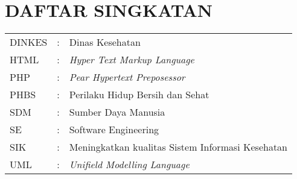 %
%
%
%

\chapter*{DAFTAR SINGKATAN}
\begin{tabular}{lll}
DINKES &:& Dinas Kesehatan\\
HTML &:& \textit{Hyper Text Markup Language}\\
PHP &:&\textit{Pear Hypertext Preposessor}\\
PHBS &:& Perilaku Hidup Bersih dan Sehat\\
SDM &:& Sumber Daya Manusia\\
SE &:& Software Engineering\\
SIK &:& Meningkatkan kualitas Sistem Informasi Kesehatan\\
UML &:& \textit{Unifield Modelling Language}\\
\end{tabular}